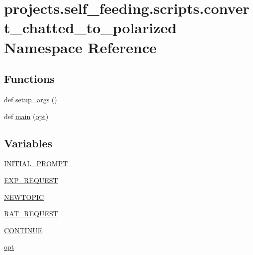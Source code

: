\hypertarget{namespaceprojects_1_1self__feeding_1_1scripts_1_1convert__chatted__to__polarized}{}\section{projects.\+self\+\_\+feeding.\+scripts.\+convert\+\_\+chatted\+\_\+to\+\_\+polarized Namespace Reference}
\label{namespaceprojects_1_1self__feeding_1_1scripts_1_1convert__chatted__to__polarized}
\subsection*{Functions}
\begin{DoxyCompactItemize}
\item 
def \hyperlink{namespaceprojects_1_1self__feeding_1_1scripts_1_1convert__chatted__to__polarized_a573a5263565e2b06291ce92dd3898524}{setup\+\_\+args} ()
\item 
def \hyperlink{namespaceprojects_1_1self__feeding_1_1scripts_1_1convert__chatted__to__polarized_ac770e55a3dab688df1d4df65d7d5263b}{main} (\hyperlink{namespaceprojects_1_1self__feeding_1_1scripts_1_1convert__chatted__to__polarized_a845edad435c87ca0aec4e83859f97e8d}{opt})
\end{DoxyCompactItemize}
\subsection*{Variables}
\begin{DoxyCompactItemize}
\item 
\hyperlink{namespaceprojects_1_1self__feeding_1_1scripts_1_1convert__chatted__to__polarized_a92e31aacc2ccceda1174141815b8ff5b}{I\+N\+I\+T\+I\+A\+L\+\_\+\+P\+R\+O\+M\+PT}
\item 
\hyperlink{namespaceprojects_1_1self__feeding_1_1scripts_1_1convert__chatted__to__polarized_a069f0770702d2886fb450fb579da347d}{E\+X\+P\+\_\+\+R\+E\+Q\+U\+E\+ST}
\item 
\hyperlink{namespaceprojects_1_1self__feeding_1_1scripts_1_1convert__chatted__to__polarized_ae1f4fe6dd80cb9a2b3da2f06361e8c36}{N\+E\+W\+T\+O\+P\+IC}
\item 
\hyperlink{namespaceprojects_1_1self__feeding_1_1scripts_1_1convert__chatted__to__polarized_a53b00c17bfdd688f6673a1ca758f961c}{R\+A\+T\+\_\+\+R\+E\+Q\+U\+E\+ST}
\item 
\hyperlink{namespaceprojects_1_1self__feeding_1_1scripts_1_1convert__chatted__to__polarized_af6ecd3f8892e598e831e4460de93c544}{C\+O\+N\+T\+I\+N\+UE}
\item 
\hyperlink{namespaceprojects_1_1self__feeding_1_1scripts_1_1convert__chatted__to__polarized_a845edad435c87ca0aec4e83859f97e8d}{opt}
\end{DoxyCompactItemize}


